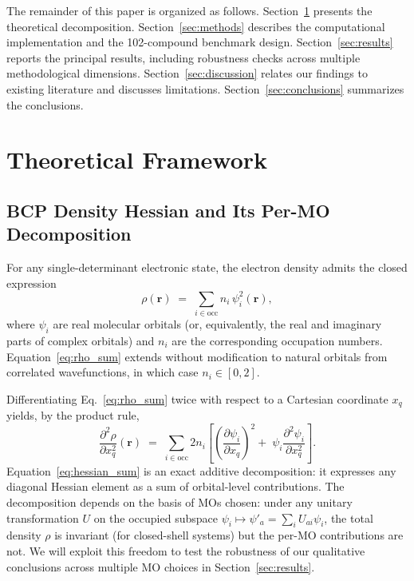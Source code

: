 \documentclass[twoside,natbib]{svjour3}
\begin{document}
The remainder of this paper is organized as follows.
Section~\ref{sec:theory} presents the theoretical decomposition.
Section~\ref{sec:methods} describes the computational implementation
and the 102-compound benchmark design.
Section~\ref{sec:results} reports the principal results, including
robustness checks across multiple methodological dimensions.
Section~\ref{sec:discussion} relates our findings to existing
literature and discusses limitations.
Section~\ref{sec:conclusions} summarizes the conclusions.

\section{Theoretical Framework}
\label{sec:theory}

\subsection{BCP Density Hessian and Its Per-MO Decomposition}

For any single-determinant electronic state, the electron density
admits the closed expression
\begin{equation}
\rho(\mathbf{r}) \;=\; \sum_{i \in \text{occ}} n_i\, \psi_i^2(\mathbf{r}),
\label{eq:rho_sum}
\end{equation}
where $\psi_i$ are real molecular orbitals (or, equivalently, the
real and imaginary parts of complex orbitals) and $n_i$ are the
corresponding occupation numbers. Equation~\ref{eq:rho_sum} extends
without modification to natural orbitals from
correlated wavefunctions, in which case $n_i \in [0,2]$.

Differentiating Eq.~\ref{eq:rho_sum} twice with respect to a Cartesian
coordinate $x_q$ yields, by the product rule,
\begin{equation}
\frac{\partial^2 \rho}{\partial x_q^2}(\mathbf{r})
\;=\;
\sum_{i \in \text{occ}} 2 n_i \!\left[
   \left(\frac{\partial \psi_i}{\partial x_q}\right)^{\!2}
   \!\!\!+\;
   \psi_i \frac{\partial^2 \psi_i}{\partial x_q^2}
\right].
\label{eq:hessian_sum}
\end{equation}
Equation~\ref{eq:hessian_sum} is an exact additive decomposition: it
expresses any diagonal Hessian element as a sum of orbital-level
contributions. The decomposition depends on the basis of MOs chosen:
under any unitary transformation $U$ on the occupied subspace
$\psi_i \mapsto \psi'_a = \sum_i U_{ai} \psi_i$, the total density
$\rho$ is invariant (for closed-shell systems) but the per-MO
contributions are not. We will exploit this freedom to test the
robustness of our qualitative conclusions across multiple MO choices
in Section~\ref{sec:results}.
\end{document}

